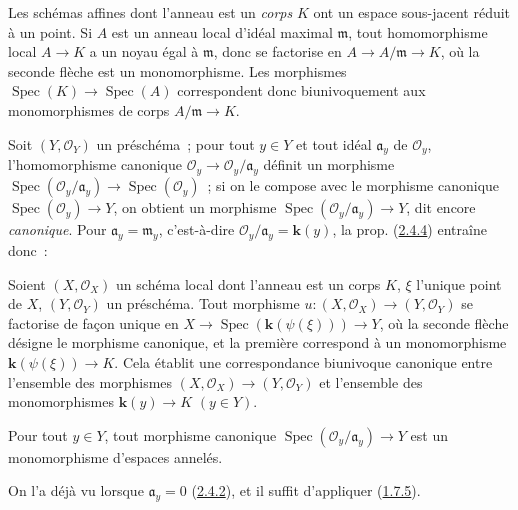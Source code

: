 \begin{env}[2.4.5]
\label{I.2.4.5-fr}
Les schémas affines dont l'anneau est un \emph{corps} $K$ ont un espace
sous-jacent réduit à un point. Si $A$ est un anneau local d'idéal maximal
$\mathfrak{m}$, tout homomorphisme local $A\to K$ a un noyau égal à
$\mathfrak{m}$, donc se factorise en
$A\to A/\mathfrak{m}\to K$, où la seconde flèche est un monomorphisme. Les
morphismes $\operatorname{Spec}(K)\to\operatorname{Spec}(A)$ correspondent
donc biunivoquement aux monomorphismes de corps $A/\mathfrak{m}\to K$.
\end{env}

Soit $(Y,\mathscr{O}_Y)$ un préschéma~; pour tout $y\in Y$ et tout idéal
$\mathfrak{a}_y$ de $\mathscr{O}_y$, l'homomorphisme canonique
$\mathscr{O}_y\to\mathscr{O}_y/\mathfrak{a}_y$ définit un morphisme
$\operatorname{Spec}(\mathscr{O}_y/\mathfrak{a}_y)
\to\operatorname{Spec}(\mathscr{O}_y)$~; si on le compose avec le morphisme
canonique $\operatorname{Spec}(\mathscr{O}_y)\to Y$, on obtient un morphisme
$\operatorname{Spec}(\mathscr{O}_y/\mathfrak{a}_y)\to Y$, dit encore
\emph{canonique}. Pour $\mathfrak{a}_y=\mathfrak{m}_y$, c'est-à-dire
$\mathscr{O}_y/\mathfrak{a}_y=\boldsymbol{k}(y)$, la prop.
(\hyperref[I.2.4.4-fr]{2.4.4}) entraîne donc~:

\begin{corollary}[2.4.6]
\label{I.2.4.6-fr}
Soient $(X,\mathscr{O}_X)$ un schéma local dont l'anneau est un corps $K$,
$\xi$ l'unique point de $X$, $(Y,\mathscr{O}_Y)$ un préschéma. Tout morphisme
$u:(X,\mathscr{O}_X)\to(Y,\mathscr{O}_Y)$ se factorise de façon unique en
$X\to\operatorname{Spec}(\boldsymbol{k}(\psi(\xi)))\to Y$, où la seconde flèche désigne le
morphisme canonique, et la première correspond à un monomorphisme
$\boldsymbol{k}(\psi(\xi))\to K$. Cela établit une correspondance biunivoque canonique
entre l'ensemble des morphismes $(X,\mathscr{O}_X)\to(Y,\mathscr{O}_Y)$ et
l'ensemble des monomorphismes $\boldsymbol{k}(y)\to K$ $(y\in Y)$.
\end{corollary}

\begin{corollary}[2.4.7]
\label{I.2.4.7-fr}
Pour tout $y\in Y$, tout morphisme canonique
$\operatorname{Spec}(\mathscr{O}_y/\mathfrak{a}_y)\to Y$ est un monomorphisme
d'espaces annelés.
\end{corollary}

On l'a déjà vu lorsque $\mathfrak{a}_y=0$
(\hyperref[I.2.4.2-fr]{2.4.2}), et il suffit d'appliquer
(\hyperref[I.1.7.5-fr]{1.7.5}).


